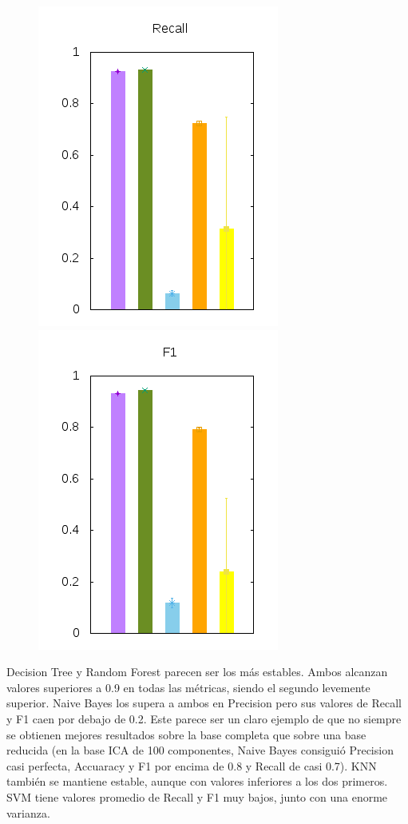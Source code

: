 \documentclass[10pt, a4paper]{article}
\begin{document}
\begin{figure}[H]
\begin{minipage}{1\textwidth}
	\includegraphics[scale=0.5]{../src/data/re.png}
	\includegraphics[scale=0.5]{../src/data/f1.png}
  \end{minipage}
\end{figure}

Decision Tree y Random Forest parecen ser los más estables. Ambos alcanzan valores superiores a 0.9 en todas las métricas, siendo el segundo levemente superior. Naive Bayes los supera a ambos en Precision pero sus valores de Recall y F1 caen por debajo de 0.2. Este parece ser un claro ejemplo de que no siempre se obtienen mejores resultados sobre la base completa que sobre una base reducida (en la base ICA de 100 componentes, Naive Bayes consiguió Precision casi perfecta, Accuaracy y F1 por encima de 0.8 y Recall de casi 0.7). KNN también se mantiene estable, aunque con valores inferiores a los dos primeros. SVM tiene valores promedio de Recall y F1 muy bajos, junto con una enorme varianza.
\end{document}
